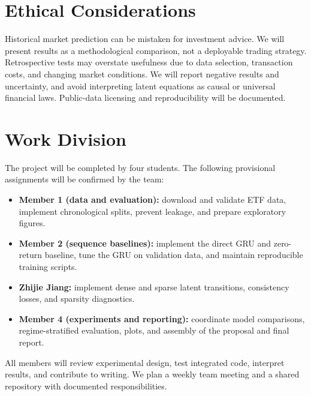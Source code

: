 \documentclass{article}
\begin{document}
\section{Ethical Considerations}
Historical market prediction can be mistaken for investment advice. We will present results as a methodological comparison, not a deployable trading strategy. Retrospective tests may overstate usefulness due to data selection, transaction costs, and changing market conditions. We will report negative results and uncertainty, and avoid interpreting latent equations as causal or universal financial laws. Public-data licensing and reproducibility will be documented.

\section{Work Division}
The project will be completed by four students. The following provisional assignments will be confirmed by the team:
\begin{itemize}
\item \textbf{Member 1 (data and evaluation):} download and validate ETF data, implement chronological splits, prevent leakage, and prepare exploratory figures.
\item \textbf{Member 2 (sequence baselines):} implement the direct GRU and zero-return baseline, tune the GRU on validation data, and maintain reproducible training scripts.
\item \textbf{Zhijie Jiang:} implement dense and sparse latent transitions, consistency losses, and sparsity diagnostics.
\item \textbf{Member 4 (experiments and reporting):} coordinate model comparisons, regime-stratified evaluation, plots, and assembly of the proposal and final report.
\end{itemize}
All members will review experimental design, test integrated code, interpret results, and contribute to writing. We plan a weekly team meeting and a shared repository with documented responsibilities.
\end{document}
